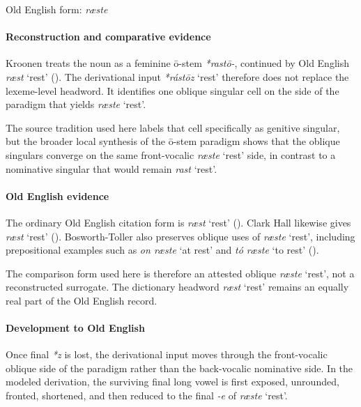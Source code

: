 \documentclass[
  british,
  a4paper,
]{article}
\providecommand{\Recon}[1]{\emph{*#1}}
\begin{document}
Old English form: \emph{ræste}

\paragraph{Reconstruction and comparative
evidence}\label{reconstruction-and-comparative-evidence-129}

Kroonen treats the noun as a feminine ō-stem {\emph{*rastō-}}, continued
by Old English {\emph{ræst}} `rest' (). The derivational input \Recon{rástōz} `rest' therefore does
not replace the lexeme-level headword. It identifies one oblique
singular cell on the side of the paradigm that yields \emph{ræste}
`rest'.

The source tradition used here labels that cell specifically as genitive
singular, but the broader local synthesis of the ō-stem paradigm shows
that the oblique singulars converge on the same front-vocalic
\emph{ræste} `rest' side, in contrast to a nominative singular that
would remain \emph{rast} `rest'.

\paragraph{Old English evidence}\label{old-english-evidence-129}

The ordinary Old English citation form is {\emph{ræst}} `rest'
(). Clark Hall likewise
gives {\emph{ræst}} `rest' (). Bosworth-Toller also preserves oblique uses of
{\emph{ræste}} `rest', including prepositional examples such as \emph{on
ræste} `at rest' and \emph{tó ræste} `to rest'
().

The comparison form used here is therefore an attested oblique
{\emph{ræste}} `rest', not a reconstructed surrogate. The dictionary
headword {\emph{ræst}} `rest' remains an equally real part of the Old
English record.

\paragraph{Development to Old
English}\label{development-to-old-english-129}

Once final \emph{*z} is lost, the derivational input moves through the
front-vocalic oblique side of the paradigm rather than the back-vocalic
nominative side. In the modeled derivation, the surviving final long
vowel is first exposed, unrounded, fronted, shortened, and then reduced
to the final \emph{-e} of \emph{ræste} `rest'.
\end{document}
